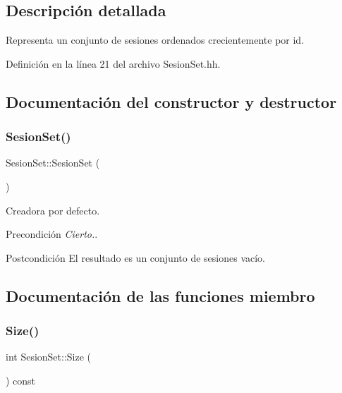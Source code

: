 \subsection{Descripción detallada}
Representa un conjunto de sesiones ordenados crecientemente por id. 

Definición en la línea 21 del archivo Sesion\+Set.\+hh.



\subsection{Documentación del constructor y destructor}
\mbox{\label{class_sesion_set_af583057121150fb193e71ae02e036bb0}} 
\subsubsection{\texorpdfstring{Sesion\+Set()}{SesionSet()}}
{\footnotesize\ttfamily Sesion\+Set\+::\+Sesion\+Set (\begin{DoxyParamCaption}{ }\end{DoxyParamCaption})}



Creadora por defecto. 

\begin{DoxyPrecond}{Precondición}
{\itshape Cierto.}. 
\end{DoxyPrecond}
\begin{DoxyPostcond}{Postcondición}
El resultado es un conjunto de sesiones vacío. 
\end{DoxyPostcond}


\subsection{Documentación de las funciones miembro}
\mbox{\label{class_sesion_set_aa4cf0fbea2b9f9b6322390fc8b4a1b4c}} 
\subsubsection{\texorpdfstring{Size()}{Size()}}
{\footnotesize\ttfamily int Sesion\+Set\+::\+Size (\begin{DoxyParamCaption}{ }\end{DoxyParamCaption}) const}



